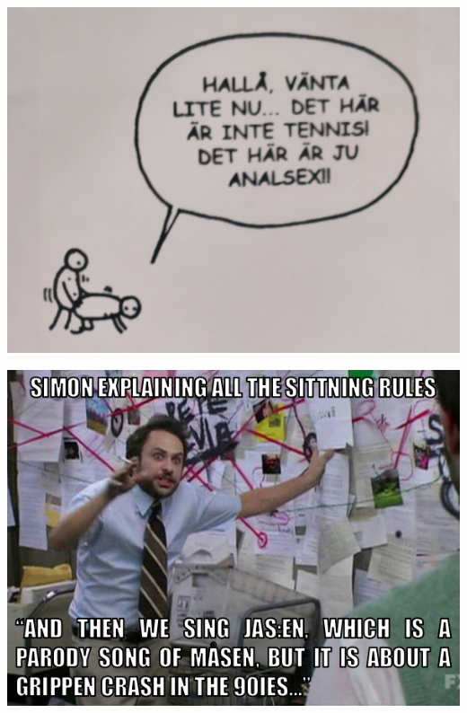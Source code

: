 \documentclass{article}
\title{\vspace{40em}\textbf{\color{white}\Huge{}}}
\date{\vspace{-3em}\color{white}}
\author{}
\begin{document}
\customtitle
\BgThispage
\clearpage

\newpage

\sffamily


\vfill
\includegraphics[width=0.9\linewidth]{images/memes/analsex.jpg}

\vfill
\newpage

\normalfont
\sitsit
\vfill

\sffamily
\vfill

\includegraphics[width=0.9\linewidth]{images/memes/jasen.png}
\vfill

\end{document}
